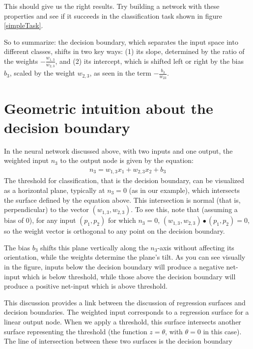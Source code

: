 This should give us the right results. Try building a network with these properties and see if it succeeds in the classification task  shown in figure \ref{simpleTask}.

So to summarize: the decision boundary, which separates the input space into different classes, shifts in two key ways: (1) its slope, determined by the ratio of the weights $-\frac{w_{1,3}}{w_{2,3}}$, and (2) its intercept, which is shifted left or right by the bias $b_3$, scaled by the weight $w_{2,3}$, as seen in the term $-\frac{b_3}{w_{23}}$.

\section{Geometric intuition about the decision boundary}


In the neural network discussed above, with two inputs and one output, the weighted input $n_3$ to the output node is given by the equation:
\begin{eqnarray*}
n_3 = w_{1,3} x_1 + w_{2,3} x_2 + b_3
\end{eqnarray*}
The threshold for classification, that is the decision boundary, can be visualized as a horizontal plane, typically at $n_3 = 0$ (as in our example), which intersects the surface defined by the equation above. This intersection is normal (that is, perpendicular) to the vector $(w_{1,3}, w_{2,3})$. To see this, note that (assuming a bias of 0), for any input $(p_1,p_2)$ for which $n_3 = 0$, $(w_{1,3}, w_{2,3}) \bullet  (p_1,p_2) = 0$, so the weight vector is orthogonal to any point on the decision boundary.

The bias $b_3$ shifts this plane vertically along the $n_3$-axis without affecting its orientation, while the weights determine the plane’s tilt. As you can see visually in the figure, inputs below the decision boundary will produce a negative net-input which is below threshold, while those above the decision boundary will produce a positive net-input which is above threshold.

This discussion provides a link between the discussion of regression surfaces and decision boundaries. The weighted input corresponds to a regression surface for a linear output node. When we apply a threshold, this surface intersects another surface representing the threshold (the function $z = \theta$, with $\theta = 0$ in this case). The line of intersection between these two surfaces is the decision boundary

